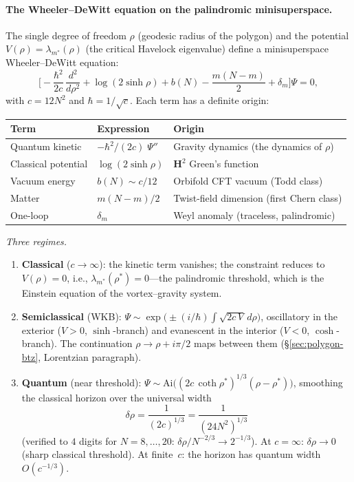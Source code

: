\paragraph{The Wheeler--DeWitt equation on the palindromic minisuperspace.}
The single degree of freedom $\rho$ (geodesic radius of the polygon)
and the potential $V(\rho) = \lambda_{m^*}(\rho)$ (the critical
Havelock eigenvalue) define a minisuperspace Wheeler--DeWitt equation:
\begin{equation}\label{eq:wdw}
  \biggl[-\frac{\hbar^2}{2c}\,\frac{d^2}{d\rho^2}
  + \log(2\sinh\rho) + b(N) - \frac{m(N{-}m)}{2}
  + \delta_m\biggr]\Psi = 0,
\end{equation}
with $c = 12N^2$ and $\hbar = 1/\sqrt{c}$.
Each term has a definite origin:
\begin{center}
\small
\begin{tabular}{lll}
\toprule
Term & Expression & Origin \\
\midrule
Quantum kinetic & $-\hbar^2/(2c)\;\Psi''$ &
  Gravity dynamics (the dynamics of $\rho$) \\
Classical potential & $\log(2\sinh\rho)$ &
  $\mathbf{H}^2$ Green's function \\
Vacuum energy & $b(N) \sim c/12$ &
  Orbifold CFT vacuum (Todd class) \\
Matter & $m(N{-}m)/2$ &
  Twist-field dimension (first Chern class) \\
One-loop & $\delta_m$ &
  Weyl anomaly (traceless, palindromic) \\
\bottomrule
\end{tabular}
\end{center}

\noindent
\emph{Three regimes.}
\begin{enumerate}
\item \textbf{Classical} ($c \to \infty$):
  the kinetic term vanishes; the constraint reduces to $V(\rho) = 0$,
  i.e., $\lambda_{m^*}(\rho^*) = 0$---the palindromic threshold,
  which is the Einstein equation of the vortex--gravity system.
\item \textbf{Semiclassical} (WKB):
  $\Psi \sim \exp\!\bigl(\pm(i/\hbar)\!\int\!\sqrt{2c\,V}\,d\rho\bigr)$,
  oscillatory in the exterior ($V > 0$, $\sinh$-branch) and evanescent
  in the interior ($V < 0$, $\cosh$-branch).
  The continuation $\rho \to \rho + i\pi/2$ maps between them
  (\S\ref{sec:polygon-btz}, Lorentzian paragraph).
\item \textbf{Quantum} (near threshold):
  $\Psi \sim \mathrm{Ai}\bigl((2c\,\coth\rho^*)^{1/3}
  (\rho - \rho^*)\bigr)$,
  smoothing the classical horizon over the universal width
\begin{equation}\label{eq:airy-width}
  \delta\rho = \frac{1}{(2c)^{1/3}} = \frac{1}{(24N^2)^{1/3}}
\end{equation}
  (verified to $4$ digits for $N = 8,\ldots,20$:
  $\delta\rho/N^{-2/3} \to 2^{-1/3}$).
  At $c = \infty$: $\delta\rho \to 0$ (sharp classical threshold).
  At finite~$c$: the horizon has quantum width $O(c^{-1/3})$.
\end{enumerate}

